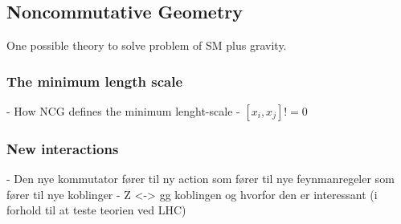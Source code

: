 \subsection{Noncommutative Geometry}

One possible theory to solve problem of SM plus gravity.

\subsubsection{The minimum length scale}
- How NCG defines the minimum lenght-scale
- $[x_i, x_j] != 0$

\subsubsection{New interactions}
- Den nye kommutator fører til ny action som fører til nye feynmanregeler som fører til nye koblinger
- Z <-> gg koblingen og hvorfor den er interessant (i forhold til at teste teorien ved LHC)